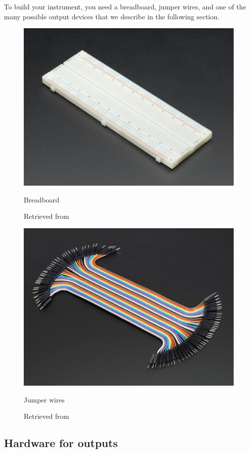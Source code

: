To build your instrument, you need a breadboard, jumper wires, and one of the many possible output devices that we describe in the following section.

\begin{figure}[ht]
  \centering
  \includegraphics[width=0.75\linewidth,height=0.25\textheight,keepaspectratio]{images/materials-adafruit-breadboard.jpg}
  \caption{Breadboard}
  \caption*{Retrieved from \cite{website-materials-adafruit-breadboard}}
  \label{fig:materials-adafruit-breadboard}
\end{figure}

\begin{figure}[ht]
  \centering
  \includegraphics[width=0.75\linewidth,height=0.25\textheight,keepaspectratio]{images/materials-adafruit-jumper-wires.jpg}
  \caption{Jumper wires}
  \caption*{Retrieved from \cite{website-materials-adafruit-jumper-wires}}
  \label{fig:materials-adafruit-jumper-wires}
\end{figure}

\subsection{Hardware for outputs}

